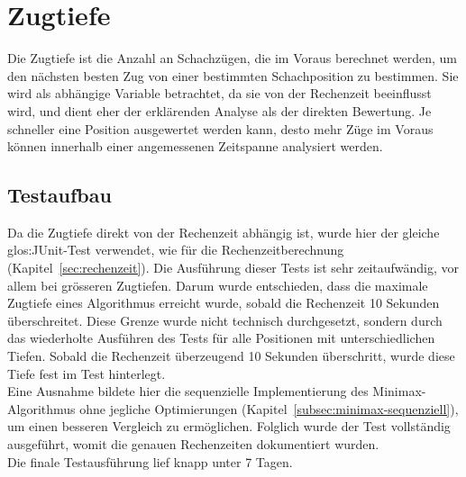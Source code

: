 \section{Zugtiefe}
Die Zugtiefe ist die Anzahl an Schachzügen, die im Voraus berechnet werden, um den nächsten besten Zug von einer bestimmten Schachposition zu bestimmen.
Sie wird als abhängige Variable betrachtet, da sie von der Rechenzeit beeinflusst wird, und dient eher der erklärenden Analyse als der direkten Bewertung.
Je schneller eine Position ausgewertet werden kann, desto mehr Züge im Voraus können innerhalb einer angemessenen Zeitspanne analysiert werden.

\subsection{Testaufbau}
Da die Zugtiefe direkt von der Rechenzeit abhängig ist, wurde hier der gleiche \gls{glos:JUnit}-Test verwendet, wie für die Rechenzeitberechnung (Kapitel~\ref{sec:rechenzeit}).
Die Ausführung dieser Tests ist sehr zeitaufwändig, vor allem bei grösseren Zugtiefen.
Darum wurde entschieden, dass die maximale Zugtiefe eines Algorithmus erreicht wurde, sobald die Rechenzeit 10 Sekunden überschreitet.
Diese Grenze wurde nicht technisch durchgesetzt, sondern durch das wiederholte Ausführen des Tests für alle Positionen mit unterschiedlichen Tiefen.
Sobald die Rechenzeit überzeugend 10 Sekunden überschritt, wurde diese Tiefe fest im Test hinterlegt. \\
Eine Ausnahme bildete hier die sequenzielle Implementierung des Minimax-Algorithmus ohne jegliche Optimierungen (Kapitel~\ref{subsec:minimax-sequenziell}), um einen besseren Vergleich zu ermöglichen.
Folglich wurde der Test vollständig ausgeführt, womit die genauen Rechenzeiten dokumentiert wurden. \\
Die finale Testausführung lief knapp unter 7 Tagen.

